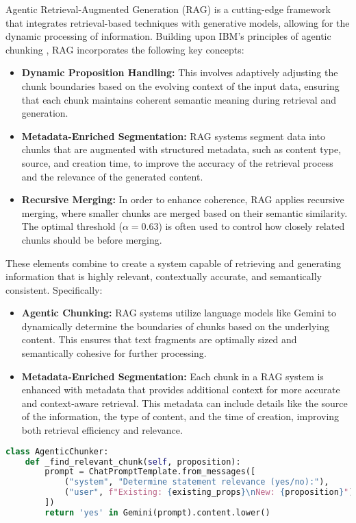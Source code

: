 \documentclass[conference]{IEEEtran}
\begin{document}
Agentic Retrieval-Augmented Generation (RAG) is a cutting-edge framework that integrates retrieval-based techniques with generative models, allowing for the dynamic processing of information. Building upon IBM’s principles of agentic chunking \cite{2}, RAG incorporates the following key concepts:

\begin{itemize}
    \item \textbf{Dynamic Proposition Handling:} This involves adaptively adjusting the chunk boundaries based on the evolving context of the input data, ensuring that each chunk maintains coherent semantic meaning during retrieval and generation.
    \item \textbf{Metadata-Enriched Segmentation:} RAG systems segment data into chunks that are augmented with structured metadata, such as content type, source, and creation time, to improve the accuracy of the retrieval process and the relevance of the generated content.
    \item \textbf{Recursive Merging:} In order to enhance coherence, RAG applies recursive merging, where smaller chunks are merged based on their semantic similarity. The optimal threshold ($\alpha=0.63$) is often used to control how closely related chunks should be before merging.
\end{itemize}

These elements combine to create a system capable of retrieving and generating information that is highly relevant, contextually accurate, and semantically consistent. Specifically:
\begin{itemize}
    \item \textbf{Agentic Chunking:} RAG systems utilize language models like Gemini to dynamically determine the boundaries of chunks based on the underlying content. This ensures that text fragments are optimally sized and semantically cohesive for further processing.
    \item \textbf{Metadata-Enriched Segmentation:} Each chunk in a RAG system is enhanced with metadata that provides additional context for more accurate and context-aware retrieval. This metadata can include details like the source of the information, the type of content, and the time of creation, improving both retrieval efficiency and relevance.
\end{itemize}

\begin{lstlisting}[language=Python]
class AgenticChunker:
    def _find_relevant_chunk(self, proposition):
        prompt = ChatPromptTemplate.from_messages([
            ("system", "Determine statement relevance (yes/no):"),
            ("user", f"Existing: {existing_props}\nNew: {proposition}")
        ])
        return 'yes' in Gemini(prompt).content.lower()
\end{lstlisting}
\end{document}
